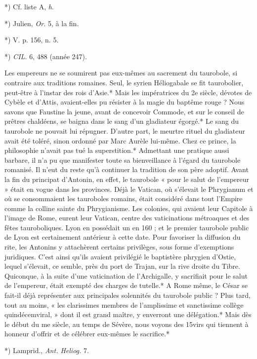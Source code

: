 \documentclass[a4paper, 11pt, oneside, polutonikogreek, french]{article}
\begin{document}
*) Cf. liste A, \emph{h}.

*) Julien, \emph{Or.} 5, à la fin.

*) V. p. 156, n. 5.

*) \emph{CIL.} 6, 488 (année 247).

Les empereurs ne se soumirent pas eux-mêmes au sacrement du taurobole, si contraire aux traditions romaines. Seul, le syrien Héliogabale se fit taurobolier, peut-être à l'instar des rois d'Asie.* Mais les impératrices du 2e siècle, dévotes de Cybèle et d'Attis, avaient-elles pu résister à la magie du baptême rouge ? Nous savons que Faustine la jeune, avant de concevoir Commode, et sur le conseil de prêtres chaldéens, se baigna dans le sang d'un gladiateur égorgé.* Le sang du taurobole ne pouvait lui répugner. D'autre part, le meurtre rituel du gladiateur avait été toléré, sinon ordonné par Marc Aurèle lui-même. Chez ce prince, la philosophie n'avait pas tué la superstition.* Admettant une pratique aussi barbare, il n'a pu que manifester toute sa bienveillance à l'égard du taurobole romanisé. Il n'eut du reste qu'à continuer la tradition de son père adoptif. Avant la fin du principat d'Antonin, en effet, le taurobole « pour le salut de l'empereur » était en vogue dans les provinces. Déjà le Vatican, où s'élevait le Phrygianum et où se consommaient les tauroboles romains, était considéré dans tout l'Empire comme la colline sainte du Phrygianisme. Les colonies, qui avaient leur Capitole à l'image de Rome, eurent leur Vatican, centre des vaticinations métroaques et des fêtes tauroboliques. Lyon en possédait un en 160 ; et le premier taurobole public de Lyon est certainement antérieur à cette date. Pour favoriser la diffusion du rite, les Antonins y attachèrent certains privilèges, sous forme d'exemptions juridiques. C'est ainsi qu'ils avaient privilégié le baptistère phrygien d'Ostie, lequel s'élevait, ce semble, près du port de Trajan, sur la rive droite du Tibre. Quiconque, à la suite d'une vaticination de l'Archigalle, y sacrifiait pour le salut de l'empereur, était exempté des charges de tutelle.* A Rome même, le César se fait-il déjà représenter aux principales solennités du taurobole public ? Plus tard, tout au moins, « les clarissimes membres de l'amplissime et sanctissime collège quindécemviral, » dont il est grand maître, y enverront une délégation.* Mais dès le début du me siècle, au temps de Sévère, nous voyons des 15virs qui tiennent à honneur d'offrir et de célébrer eux-mêmes le sacrifice.*

*) Lamprid., \emph{Ant. Heliog.} 7.
\end{document}
